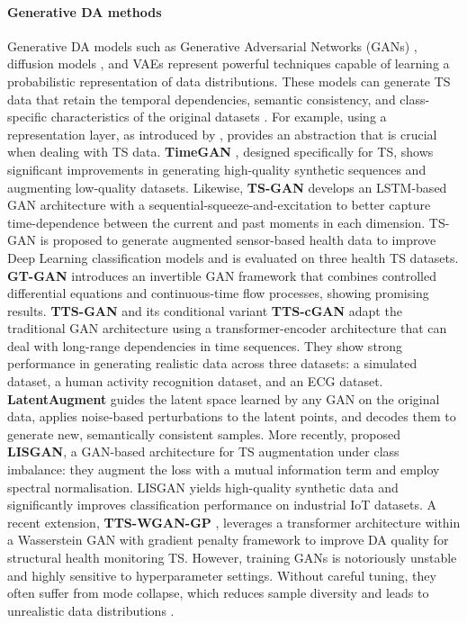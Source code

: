 \paragraph{Generative DA methods}
Generative DA models such as Generative Adversarial Networks (GANs) \citep{goodfellow2020generative},
diffusion models \citep{yang2023diffusion}, and VAEs
\citep{kingma2013auto} represent powerful techniques capable of
learning a probabilistic representation of data distributions.
These models can generate TS data that retain the
temporal dependencies, semantic consistency, and class-specific
characteristics of the original datasets \citep{fu2020data}. For
example, using a representation layer, as introduced by
\cite{liu2022learning}, provides an abstraction that is crucial
when dealing with TS data. \textbf{TimeGAN}
\citep{zhang2022data}, designed specifically for TS, shows
significant improvements in generating high-quality synthetic
sequences and augmenting low-quality datasets. Likewise, \textbf{TS-GAN} \citep{yang2023ts} develops
an LSTM-based GAN architecture with a
sequential-squeeze-and-excitation to better capture
time-dependence between the current and past moments in each
dimension. TS-GAN is proposed to generate augmented sensor-based
health data to improve Deep Learning classification models and
is evaluated on three health TS datasets.
\textbf{GT-GAN} \citep{jeon2022gt} introduces an invertible GAN
framework that combines controlled differential equations and
continuous-time flow processes, showing promising results.
\textbf{TTS-GAN} \citep{li2022tts} and its conditional variant
\textbf{TTS-cGAN} \citep{li2022ttsc} adapt the traditional GAN
architecture using a transformer-encoder architecture that can
deal with long-range dependencies in time sequences. They show
strong performance in generating realistic data across three
datasets: a simulated dataset, a human activity recognition
dataset, and an ECG dataset. \textbf{LatentAugment}
\citep{tronchin2023latentaugment} guides the latent space
learned by any GAN on the original data, applies noise-based
perturbations to the latent points, and decodes them to generate
new, semantically consistent samples. More recently,
\cite{seon2024least} proposed \textbf{LISGAN}, a GAN-based
architecture for TS augmentation under class
imbalance: they augment the loss with a mutual information term
and employ spectral normalisation. LISGAN yields high-quality
synthetic data and significantly improves classification
performance on industrial IoT datasets. A recent extension,
\textbf{TTS-WGAN-GP} \citep{mousavi2025transformer}, leverages
a transformer architecture within a Wasserstein GAN with gradient
penalty framework to improve DA quality for structural health
monitoring TS. However, training GANs is notoriously
unstable and highly sensitive to hyperparameter settings.
Without careful tuning, they often suffer from mode collapse,
which reduces sample diversity and leads to unrealistic data
distributions \citep{lei2019mode}.

